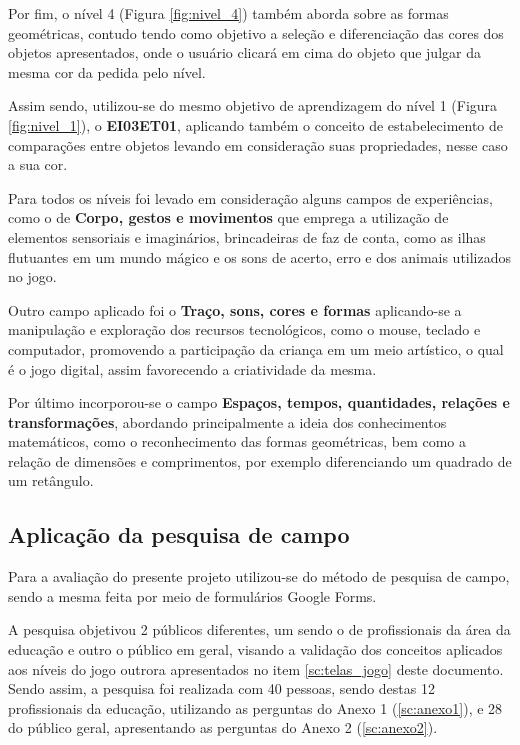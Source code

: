 \documentclass[article,12pt,openany,oneside,a4paper,english,brazil]{abntex2}
\begin{document}
Por fim, o nível 4 (Figura \ref{fig:nivel_4}) também aborda sobre as formas geométricas, contudo tendo como objetivo a seleção e diferenciação das cores dos objetos apresentados, onde o usuário clicará em cima do objeto que julgar da mesma cor da pedida pelo nível.

Assim sendo, utilizou-se do mesmo objetivo de aprendizagem do nível 1 (Figura \ref{fig:nivel_1}), o \textbf{EI03ET01}, aplicando também o conceito de estabelecimento de comparações entre objetos levando em consideração suas propriedades, nesse caso a sua cor.

Para todos os níveis foi levado em consideração alguns campos de experiências, como o de \textbf{Corpo, gestos e movimentos} que emprega a utilização de elementos sensoriais e imaginários, brincadeiras de faz de conta, como as ilhas flutuantes em um mundo mágico e os sons de acerto, erro e dos animais utilizados no jogo.

Outro campo aplicado foi o \textbf{Traço, sons, cores e formas} aplicando-se a manipulação e exploração dos recursos tecnológicos, como o mouse, teclado e computador, promovendo a participação da criança em um meio artístico, o qual é o jogo digital, assim favorecendo a criatividade da mesma.

Por último incorporou-se o campo \textbf{Espaços, tempos, quantidades, relações e transformações}, abordando principalmente a ideia dos conhecimentos matemáticos, como o reconhecimento das formas geométricas, bem como a relação de dimensões e comprimentos, por exemplo diferenciando um quadrado de um retângulo.

\subsection{Aplicação da pesquisa de campo}
\label{sc:aplicacao_pesquisa}

Para a avaliação do presente projeto utilizou-se do método de pesquisa de campo, sendo a mesma feita por meio de formulários Google Forms.

A pesquisa objetivou 2 públicos diferentes, um sendo o de profissionais da área da educação e outro o público em geral, visando a validação dos conceitos aplicados aos níveis do jogo outrora apresentados no item \ref{sc:telas_jogo} deste documento. Sendo assim, a pesquisa foi realizada com 40 pessoas, sendo destas 12 profissionais da educação, utilizando as perguntas do Anexo 1 (\ref{sc:anexo1}), e 28 do público geral, apresentando as perguntas do Anexo 2 (\ref{sc:anexo2}).
\end{document}
